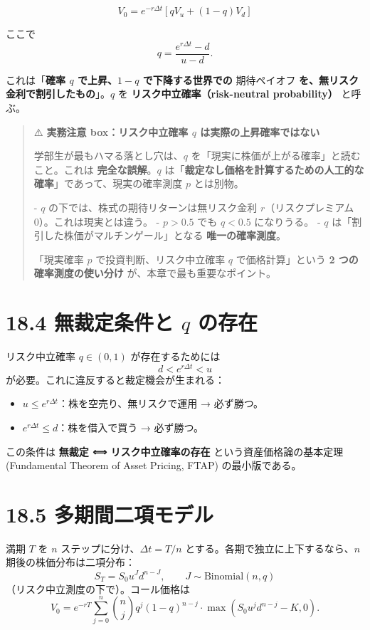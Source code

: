\documentclass[11pt,a4paper]{report}
\begin{document}
\[ \boxed{\;V_0 = e^{-r\Delta t} [q V_u + (1 - q) V_d]\;} \]

ここで \[ q = \frac{e^{r \Delta t} - d}{u - d}. \]

これは「\textbf{確率 $q$ で上昇、$1-q$ で下降する世界での }期待ペイオフ\textbf{ を、無リスク金利で割引したもの}」。$q$ を \textbf{リスク中立確率（risk-neutral probability）} と呼ぶ。

\begin{quote}
⚠️ \textbf{実務注意 box：リスク中立確率 $q$ は実際の上昇確率ではない}

学部生が最もハマる落とし穴は、$q$ を「現実に株価が上がる確率」と読むこと。これは \textbf{完全な誤解}。$q$ は「\textbf{裁定なし価格を計算するための人工的な確率}」であって、現実の確率測度 $p$ とは別物。

- $q$ の下では、株式の期待リターンは無リスク金利 $r$（リスクプレミアム 0）。これは現実とは違う。
- $p > 0.5$ でも $q < 0.5$ になりうる。
- $q$ は「割引した株価がマルチンゲール」となる \textbf{唯一の確率測度}。

「現実確率 $p$ で投資判断、リスク中立確率 $q$ で価格計算」という \textbf{2 つの確率測度の使い分け} が、本章で最も重要なポイント。
\end{quote}

\section{18.4 無裁定条件と $q$ の存在}

リスク中立確率 $q \in (0, 1)$ が存在するためには \[ d < e^{r \Delta t} < u \] が必要。これに違反すると裁定機会が生まれる：

\begin{itemize}
\item $u \le e^{r \Delta t}$：株を空売り、無リスクで運用 → 必ず勝つ。
\item $e^{r \Delta t} \le d$：株を借入で買う → 必ず勝つ。
\end{itemize}

この条件は \textbf{無裁定 ⟺ リスク中立確率の存在} という資産価格論の基本定理 (Fundamental Theorem of Asset Pricing, FTAP) の最小版である。

\section{18.5 多期間二項モデル}

満期 $T$ を $n$ ステップに分け、$\Delta t = T/n$ とする。各期で独立に上下するなら、$n$ 期後の株価分布は二項分布： \[ S_T = S_0 u^J d^{n-J}, \qquad J \sim \mathrm{Binomial}(n, q) \] （リスク中立測度の下で）。コール価格は \[ V_0 = e^{-rT} \sum_{j=0}^n \binom{n}{j} q^j (1-q)^{n-j} \cdot \max(S_0 u^j d^{n-j} - K, 0). \]
\end{document}
